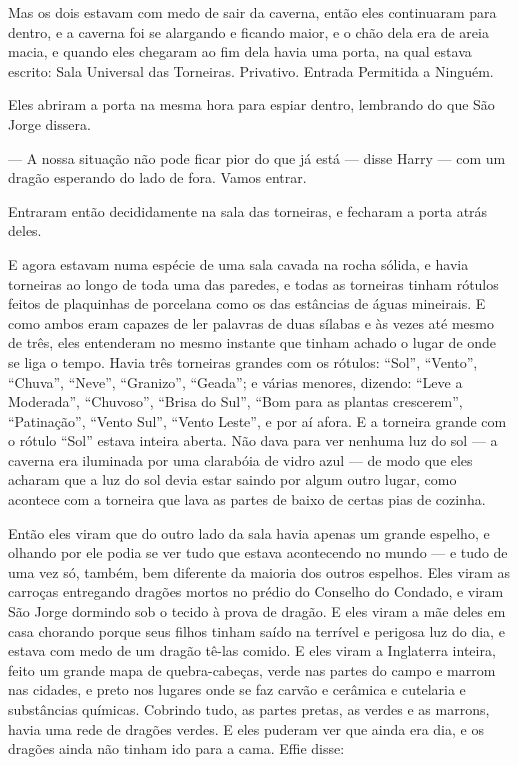 Mas os dois estavam com medo de sair da caverna, então eles
continuaram para dentro, e a caverna foi se alargando e ficando
maior, e o chão dela era de areia macia, e quando eles chegaram ao
fim dela havia uma porta, na qual estava escrito: Sala Universal das
Torneiras. Privativo. Entrada Permitida a Ninguém.

Eles abriram a porta na mesma hora para espiar dentro, lembrando do
que São Jorge dissera.

— A nossa situação não pode ficar pior do que já está — disse Harry —
com um dragão esperando do lado de fora. Vamos entrar.

Entraram então decididamente na sala das torneiras, e fecharam a porta
atrás deles.

E agora estavam numa espécie de uma sala cavada na rocha sólida, e
havia torneiras ao longo de toda uma das paredes, e todas as
torneiras tinham rótulos feitos de plaquinhas de porcelana como os
das estâncias de águas mineirais. E como ambos eram capazes de ler
palavras de duas sílabas e às vezes até mesmo de três, eles
entenderam no mesmo instante que tinham achado o lugar de onde se
liga o tempo. Havia três torneiras grandes com os rótulos: “Sol”,
“Vento”, “Chuva”, “Neve”, “Granizo”, “Geada”; e várias menores,
dizendo: “Leve a Moderada”, “Chuvoso”, “Brisa do Sul”, “Bom para as
plantas crescerem”, “Patinação”, “Vento Sul”, “Vento Leste”, e por aí
afora. E a torneira grande com o rótulo “Sol” estava inteira aberta.
Não dava para ver nenhuma luz do sol — a caverna era iluminada por
uma clarabóia de vidro azul — de modo que eles acharam que a luz do
sol devia estar saindo por algum outro lugar, como acontece com a
torneira que lava as partes de baixo de certas pias de cozinha.

Então eles viram que do outro lado da sala havia apenas um grande
espelho, e olhando por ele podia se ver tudo que estava acontecendo
no mundo — e tudo de uma vez só, também, bem diferente da maioria dos
outros espelhos. Eles viram as carroças entregando dragões mortos no
prédio do Conselho do Condado, e viram São Jorge dormindo sob o
tecido à prova de dragão. E eles viram a mãe deles em casa chorando
porque seus filhos tinham saído na terrível e perigosa luz do dia, e
estava com medo de um dragão tê-las comido. E eles viram a Inglaterra
inteira, feito um grande mapa de quebra-cabeças, verde nas partes do
campo e marrom nas cidades, e preto nos lugares onde se faz carvão e
cerâmica e cutelaria e substâncias químicas. Cobrindo tudo, as partes
pretas, as verdes e as marrons, havia uma rede de dragões verdes. E
eles puderam ver que ainda era dia, e os dragões ainda não tinham ido
para a cama. Effie disse:

